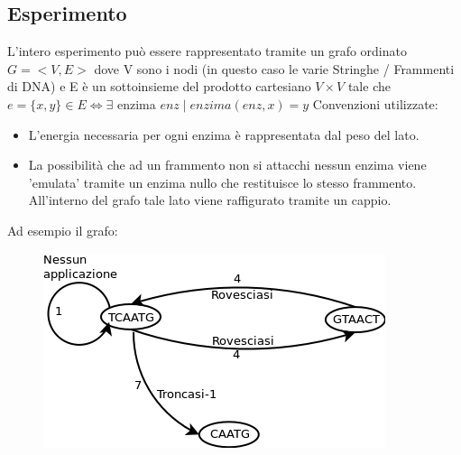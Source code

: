 \documentclass[a4paper,10pt]{article}
\begin{document}
\subsection{Esperimento}
L'intero esperimento può essere rappresentato tramite un grafo ordinato $G=<V,E>$ dove V sono i nodi (in questo caso le varie Stringhe / Frammenti di DNA) e E è un sottoinsieme del prodotto cartesiano $V\times V$ tale che $e = \{x,y\} \in E \iff \exists$ enzima $enz \mid enzima(enz,x)=y$
Convenzioni utilizzate: \begin{itemize}
\item L'energia necessaria per ogni enzima è rappresentata dal peso del lato. \item La possibilità che ad un frammento non si attacchi nessun enzima viene 'emulata' tramite un enzima nullo che restituisce lo stesso frammento. All'interno del grafo tale lato viene raffigurato tramite un cappio.

\end{itemize}
Ad esempio il grafo: \begin{figure}[htop]
\centering\includegraphics[scale=0.5]{graph1.png}\end{figure}
\end{document}
